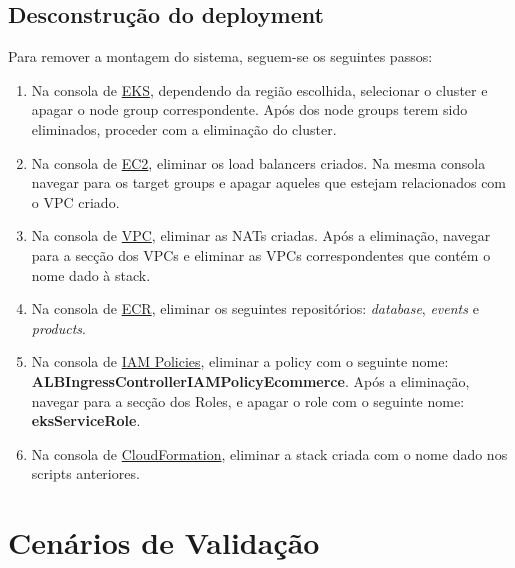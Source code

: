 \documentclass[11pt,a4paper]{article}
\begin{document}
\subsection{Desconstrução do deployment}
Para remover a montagem do sistema, seguem-se os seguintes passos:
\begin{enumerate}
	\item Na consola de \href{https://eu-west-1.console.aws.amazon.com/eks/home?region=eu-west-1#/clusters}{EKS}, dependendo da região escolhida, selecionar o cluster e apagar o node group correspondente. Após dos node groups terem sido eliminados, proceder com a eliminação do cluster.
	\item Na consola de \href{https://eu-west-1.console.aws.amazon.com/ec2/v2/home?region=eu-west-1#LoadBalancers}{EC2}, eliminar os load balancers criados. Na mesma consola navegar para os target groups e apagar aqueles que estejam relacionados com o VPC criado.
	\item Na consola de \href{https://eu-west-1.console.aws.amazon.com/vpc/home?region=eu-west-1#NatGateways}{VPC}, eliminar as NATs criadas. Após a eliminação, navegar para a secção dos VPCs e eliminar as VPCs correspondentes que contém o nome dado à stack.
	\item Na consola de \href{https://console.aws.amazon.com/ecr/repositories?region=us-east-1}{ECR}, eliminar os seguintes repositórios: \textit{database}, \textit{events} e \textit{products}.
	\item Na consola de \href{https://console.aws.amazon.com/iam/home?#/policies}{IAM Policies}, eliminar a policy com o seguinte nome: \textbf{ALBIngressControllerIAMPolicyEcommerce}. Após a eliminação, navegar para a secção dos Roles, e apagar o role com o seguinte nome: \textbf{eksServiceRole}.
	\item Na consola de \href{https://eu-west-1.console.aws.amazon.com/cloudformation/home?region=eu-west-1#/stacks}{CloudFormation}, eliminar a stack criada com o nome dado nos scripts anteriores.
\end{enumerate}

\section{Cenários de Validação}
\end{document}
